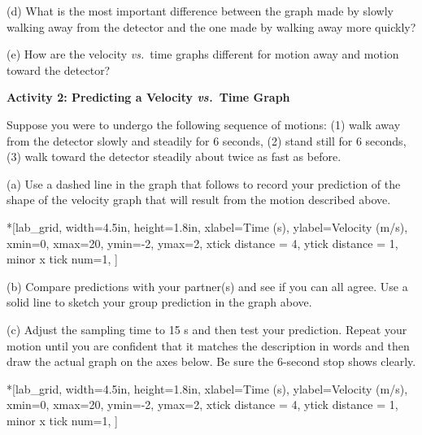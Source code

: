 (d) What is the most important difference between the graph made by slowly walking
away from the detector and the one made by walking away more quickly? 
\answerspace{25mm}

(e) How are the velocity \textit{vs.}~time graphs different for motion away and motion
toward the detector?
\answerspace{25mm}

\pagebreak[2]
\textbf{Activity 2: Predicting a Velocity \textit{vs.}~Time Graph }

Suppose you were to undergo the following sequence of motions: (1) walk away
from the detector slowly and steadily for 6 seconds, (2) stand still for 6 seconds,
(3) walk toward the detector steadily about twice as fast as before.

(a) Use a dashed line in the graph that follows to record your prediction of
the shape of the velocity graph that will result from the motion described above.

\begin{lab_axis}*[lab_grid,
	width=4.5in, height=1.8in,
	xlabel={Time (s)},
	ylabel={Velocity (m/s)},
	xmin=0, xmax=20,
	ymin=-2, ymax=2,
	xtick distance = 4,
	ytick distance = 1,
	minor x tick num=1,
	]
\end{lab_axis}

(b) Compare predictions with your partner(s) and see if you can all agree. Use
a solid line to sketch your group prediction in the graph above.

(c) Adjust the sampling time to 15 s and then test your prediction. Repeat your
motion until you are confident that it matches the description in words and
then draw the actual graph on the axes below. Be sure the 6-second stop shows
clearly.

\begin{lab_axis}*[lab_grid,
	width=4.5in, height=1.8in,
	xlabel={Time (s)},
	ylabel={Velocity (m/s)},
	xmin=0, xmax=20,
	ymin=-2, ymax=2,
	xtick distance = 4,
	ytick distance = 1,
	minor x tick num=1,
	]
\end{lab_axis}

